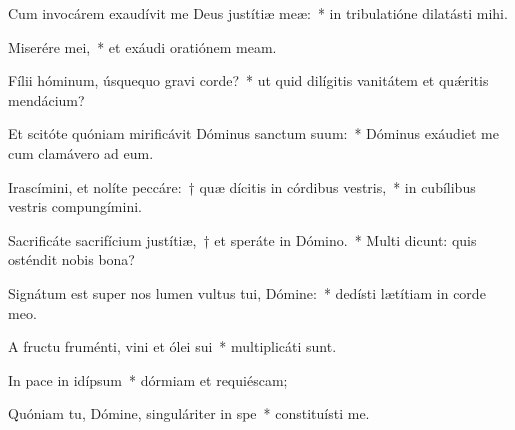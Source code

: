 \item Cum invocárem exaudívit me Deus justítiæ meæ:~* in tribulatióne dilatásti mihi.

\item Miserére mei,~* et exáudi oratiónem meam.

\item Fílii hóminum, úsquequo gravi corde?~* ut quid dilígitis vanitátem et quǽritis mendácium?

\item Et scitóte quóniam mirificávit Dóminus sanctum suum:~* Dóminus exáudiet me cum clamávero ad eum.

\item Irascímini, et nolíte peccáre:~† quæ dícitis in córdibus vestris,~* in cubílibus vestris compungímini.

\item Sacrificáte sacrifícium justítiæ,~† et speráte in Dómino.~* Multi dicunt: quis osténdit nobis bona?

\item Signátum est super nos lumen vultus tui, Dómine:~* dedísti lætítiam in corde meo.

\item A fructu fruménti, vini et ólei sui~* multiplicáti sunt.

\item In pace in idípsum~* dórmiam et requiéscam;

\item Quóniam tu, Dómine, singuláriter in spe~* constituísti me.

